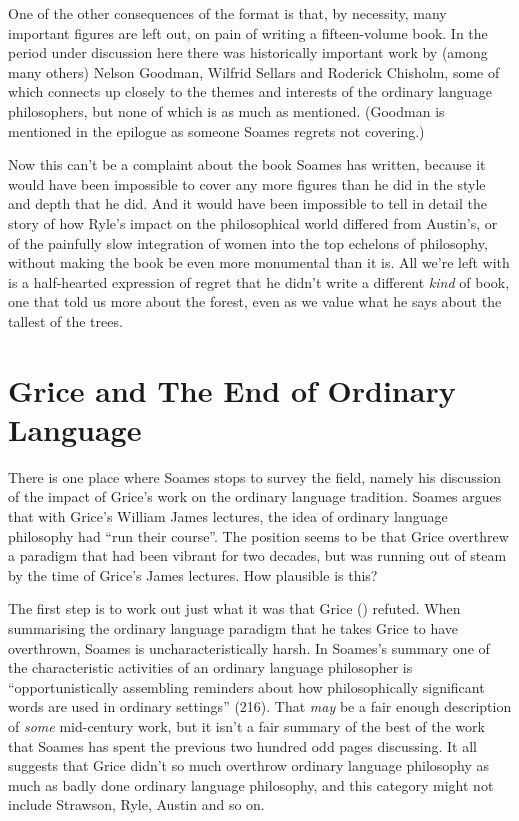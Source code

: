 \documentclass[
  10pt,
  letterpaper,
  DIV=11,
  numbers=noendperiod,
  twoside]{scrartcl}
\begin{document}
One of the other consequences of the format is that, by necessity, many
important figures are left out, on pain of writing a fifteen-volume
book. In the period under discussion here there was historically
important work by (among many others) Nelson Goodman, Wilfrid Sellars
and Roderick Chisholm, some of which connects up closely to the themes
and interests of the ordinary language philosophers, but none of which
is as much as mentioned. (Goodman is mentioned in the epilogue as
someone Soames regrets not covering.)

Now this can't be a complaint about the book Soames has written, because
it would have been impossible to cover any more figures than he did in
the style and depth that he did. And it would have been impossible to
tell in detail the story of how Ryle's impact on the philosophical world
differed from Austin's, or of the painfully slow integration of women
into the top echelons of philosophy, without making the book be even
more monumental than it is. All we're left with is a half-hearted
expression of regret that he didn't write a different \emph{kind} of
book, one that told us more about the forest, even as we value what he
says about the tallest of the trees.

\section{Grice and The End of Ordinary
Language}\label{grice-and-the-end-of-ordinary-language}

There is one place where Soames stops to survey the field, namely his
discussion of the impact of Grice's work on the ordinary language
tradition. Soames argues that with Grice's William James lectures, the
idea of ordinary language philosophy had ``run their course''. The
position seems to be that Grice overthrew a paradigm that had been
vibrant for two decades, but was running out of steam by the time of
Grice's James lectures. How plausible is this?

The first step is to work out just what it was that Grice
() refuted. When summarising the ordinary
language paradigm that he takes Grice to have overthrown, Soames is
uncharacteristically harsh. In Soames's summary one of the
characteristic activities of an ordinary language philosopher is
``opportunistically assembling reminders about how philosophically
significant words are used in ordinary settings'' (216). That \emph{may}
be a fair enough description of \emph{some} mid-century work, but it
isn't a fair summary of the best of the work that Soames has spent the
previous two hundred odd pages discussing. It all suggests that Grice
didn't so much overthrow ordinary language philosophy as much as badly
done ordinary language philosophy, and this category might not include
Strawson, Ryle, Austin and so on.
\end{document}
